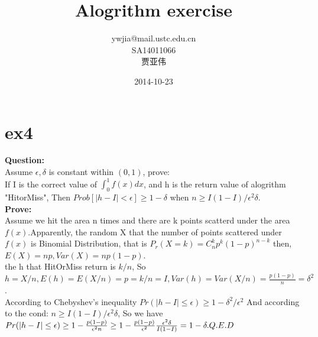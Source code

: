 \documentclass[10pt, a4paper]{article}
\title{\textbf{Alogrithm exercise }}
\author{ywjia@mail.ustc.edu.cn\\
		SA14011066\\
		贾亚伟}
\date{2014-10-23}
\begin{document}
\maketitle

\section{ex4}
\textbf{Question:} \\
Assume $\epsilon, \delta$ is constant within $(0, 1)$, prove: \\
If I is the correct value of $\int_0^1{f(x)dx}$, and h is the return value of alogrithm "HitorMiss", Then $Prob[|h-I| < \epsilon] \geq 1 - \delta$ when $n \geq I(1-I)/\epsilon^{2}\delta$. \\
 \textbf{Prove:}\\
Assume we hit the area n times and there are  k points scatterd under the area $f(x)$.Apparently, the random X that the number of points scattered under $f(x)$ is Binomial Distribution, that is $P_r(X = k) = C_n^{k}p^{k}(1-p)^{n-k}$
then, $E(X) = np, Var(X) = np(1-p)$.\\
the h that HitOrMiss return is $k/n$, So $h = X/n, E(h) = E(X/n) = p = k/n = I, Var(h) = Var(X/n) = \frac{p(1-p)}{n} = \delta^{2}$. \\
According to Chebyshev's inequality $Pr(|h - I| \leq \epsilon) \geq 1 - \delta^{2}/\epsilon^{2} $  And according to the cond: $n \geq I(1-I)/\epsilon^{2}\delta$, So we have $Pr(|h - I| \leq \epsilon )\geq 1 - \frac{p(1-p)}{\epsilon^{2}n} \geq 1 - \frac{p(1-p)}{\epsilon^{2}}\frac{\epsilon^{2}\delta}{I(1-I)} = 1 - \delta.\\
Q.E.D$
\end{document}
